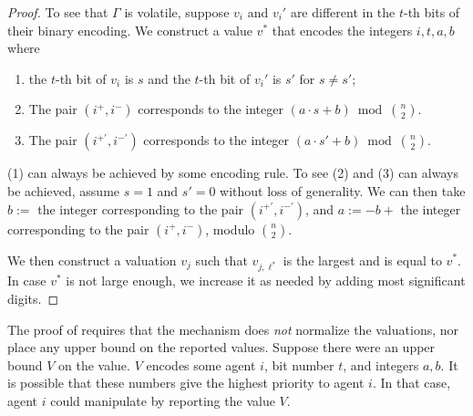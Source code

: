 \begin{proof}
    To see that $\Gamma$ is volatile, suppose $v_i$ and $v_i'$ are different in the $t$-th bits of their binary encoding.
    We construct a value $v^*$ that encodes the integers
    $i,t,a,b$ where
    \begin{enumerate}
        \item the $t$-th bit of $v_{i}$ is $s$ and the $t$-th bit of $v_{i}'$ is $s'$ for $s\neq s'$;
        \item The pair $(i^+,i^-)$ corresponds to the integer $(a\cdot s + b) \bmod {n \choose 2}$.
        \item The pair $(i^{+'},i^{-'})$ corresponds to the integer $(a\cdot s' + b) \bmod {n \choose 2}$.
    \end{enumerate}
    (1) can always be achieved by some encoding rule.
    To see (2) and (3) can always be achieved, assume $s=1$ and $s'=0$ without loss of generality.
We can then take $b := $ the integer corresponding to the pair $(i^{+'},i^{-'})$, and $a := - b + $ the integer corresponding to the pair $(i^{+},i^{-})$, modulo ${n\choose 2}$.
    
    
    We then construct a valuation $v_j$ such that $v_{j,\ell^\ast}$ is the largest and is equal to $v^*$.
    In case $v^*$ is not large enough, we increase it as needed by adding most significant digits.
\end{proof}

\begin{remark}
The proof of  requires that the mechanism does \emph{not} normalize the valuations, nor place any upper bound on the reported values. Suppose there were an upper bound $V$ on the value. $V$ encodes some agent $i$, bit number $t$, and integers $a,b$. It is possible that these numbers give the highest priority to agent $i$. In that case, agent $i$ could manipulate by reporting the value $V$.
\end{remark}

